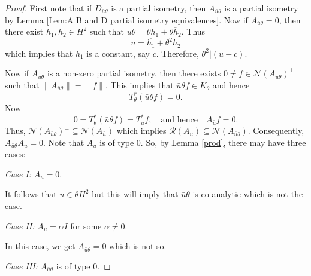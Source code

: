 \documentclass[10pt,a4paper]{amsart}
\newcommand{\NI}{\noindent}
\newcommand{\cln}{\mathcal{N}}
\newcommand{\clr}{\mathcal{R}}
\newcommand{\h}{{H}^2}
\begin{document}
\begin{proof}
First note that if $D_{\bar{u}\theta}$ is a partial isometry, then $A_{\bar{u}\theta}$ is a partial isometry by Lemma \ref{Lem:A B and D partial isometry equivalences}. Now if $A_{\bar{u}\theta} = 0$, then there exist $h_1, h_2 \in H^2$ such that
$\bar{u}\theta= \theta h_1 +\overline{\theta h_2}$.
Thus
\[
{u}=\overline{h_1}+{\theta^2 h_2}
\]
which implies that $h_1$ is a constant, say $c$. Therefore, $\theta^2 |(u-c)$.
		
Now if $A_{\bar{u} \theta}$ is a non-zero partial isometry, then there exists $0 \neq f \in \cln(A_{\bar{u}\theta})^{\perp}$ such that $\|A_{\bar{u}\theta} \| = \|f \|$.
This implies that $\bar{u}\theta f \in K_\theta$ and hence
\[
T_\theta^* (\bar{u}\theta f)=0.
\]
Now
\[
0=T_\theta^* (\bar{u}\theta f)= T_u^* f, \quad \mbox{and hence} \quad A_{\bar{u}} f =0.
\]
Thus, $\cln (A_{\bar{u}\theta})^\perp \subseteq \cln (A_{\bar{u}})$ which implies 	$\clr(A_u) \subseteq \cln(A_{\bar{u}\theta})$. Consequently, $A_{\bar{u}\theta} A_u=0$. Note that $A_{u}$ is of type $0$. So, by Lemma \ref{prod}, there may have three cases:

\NI		
\textit{Case I:} $A_{u}=0$.

It follows that $u\in\theta \h$ but this  will imply that $\bar{u}\theta$ is co-analytic which is not the case.
\vspace{.1cm}
	
\NI		
\textit{Case II:} $A_{u}= \alpha I$ for some $\alpha \neq 0$.

In this case, we get $A_{\bar{u}\theta}=0$ which is not so.
\vspace{.1cm}

\NI		
\textit{Case III:} $A_{\bar{u}\theta}$ is of type $0$.


\end{proof}
\end{document}
